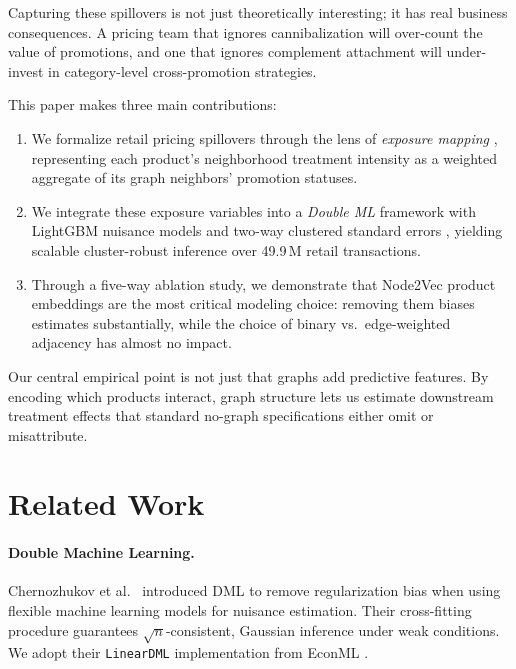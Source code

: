 \documentclass[conference]{IEEEtran}
\begin{document}
Capturing these spillovers is not just theoretically interesting; it has
real business consequences.
A pricing team that ignores cannibalization will over-count the value of
promotions, and one that ignores complement attachment will under-invest in
category-level cross-promotion strategies.

This paper makes three main contributions:

\begin{enumerate}
    \item We formalize retail pricing spillovers through the lens of
          \emph{exposure mapping} \cite{aronow2017estimating}, representing each
          product's neighborhood treatment intensity as a weighted aggregate of
          its graph neighbors' promotion statuses.

    \item We integrate these exposure variables into a
          \emph{Double ML} \cite{chernozhukov2018double} framework with
          LightGBM \cite{ke2017lightgbm} nuisance models and two-way clustered
          standard errors \cite{cameron2011robust}, yielding scalable
          cluster-robust inference over
          49.9\,M retail transactions.

    \item Through a five-way ablation study, we demonstrate that
          Node2Vec \cite{grover2016node2vec} product embeddings are the most
          critical modeling choice: removing them biases estimates substantially,
          while the choice of binary vs.\ edge-weighted adjacency has almost no
          impact.
\end{enumerate}

Our central empirical point is not just that graphs add predictive features.
By encoding which products interact, graph structure lets us estimate
downstream treatment effects that standard no-graph specifications either
omit or misattribute.


\section{Related Work}

\paragraph{Double Machine Learning.}
Chernozhukov et al.\ \cite{chernozhukov2018double} introduced DML to
remove regularization bias when using flexible machine learning models for
nuisance estimation.
Their cross-fitting procedure guarantees $\sqrt{n}$-consistent, Gaussian
inference under weak conditions.
We adopt their \texttt{LinearDML} implementation from
EconML \cite{battocchi2019econml}.
\end{document}
